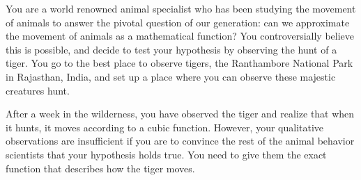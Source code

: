
You are a world renowned animal specialist who has been studying the movement of animals to answer the pivotal question of our generation: can we approximate the movement of animals as a mathematical function? You controversially believe this is possible, and decide to test your hypothesis by observing the hunt of a tiger. You go to the best place to observe tigers, the Ranthambore National Park in Rajasthan, India, and set up a place where you can observe these majestic creatures hunt.

After a week in the wilderness, you have observed the tiger and realize that when it hunts, it moves according to a cubic function. However, your qualitative observations are insufficient if you are to convince the rest of the animal behavior scientists that your hypothesis holds true. You need to give them the exact function that describes how the tiger moves.

